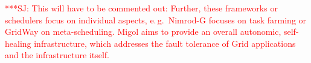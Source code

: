 \documentclass{rspublic}
\newcommand{\alnote}[1]{ {\textcolor{blue} { ***AL: #1 }}}
\newcommand{\jhanote}[1]{ {\textcolor{red} { ***SJ: #1 }}}
\newcommand{\alnote}[1]{}
\newcommand{\jhanote}[1]{}
\begin{document}
\jhanote{This will have to be commented out: Further, these frameworks
  or schedulers focus on individual aspects, e.\,g.\ Nimrod-G focuses
  on task farming or GridWay on meta-scheduling. Migol aims to provide
  an overall autonomic, self-healing infrastructure, which addresses
  the fault tolerance of Grid applications and the infrastructure
  itself.}


\end{document}

